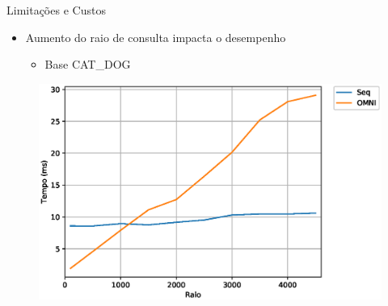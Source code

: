 \documentclass{beamer}
\begin{document}
\begin{frame}{Limitações e Custos}
 \begin{itemize}
  \item Aumento do raio de consulta impacta o desempenho\newline
    \begin{itemize}
      \item Base CAT\_DOG
    \end{itemize}
 \end{itemize}

   \begin{figure}[H]
      \centering
      \includegraphics[width=.75\textwidth]{dados/figuras/raioCD.eps}
  \end{figure}
 
%            
 
\end{frame}
\end{document}
